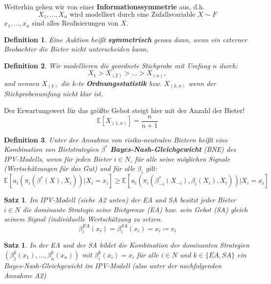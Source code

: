 \documentclass[12pt]{extreport} %
\theoremstyle{named}
\theoremstyle{itshape}
\newtheorem{satz}[unnamedtheorem]{Satz}
\newtheorem*{definition}{Definition}
\theoremstyle{normal}
\begin{document}
	Weiterhin gehen wir von einer \textbf{Informationssymmetrie} aus, d.h.
	$$ X_{1}, \dotsc, X_{n} \text{ wird modelliert durch eine Zufallsvariable } X \sim F $$
	$x_{1}, \dotsc, x_{n}$ sind alles Realisierungen von $X$.

 
\begin{definition}
	Eine Auktion heißt \textbf{symmetrisch} genau dann, wenn ein externer Beobachter die Bieter nicht unterscheiden kann.
\end{definition}

\begin{definition}
	Wir modellieren die geordnete Stichprobe mit Umfang $n$ durch:
		$$ X_{{1}} > X_{(2)} > \dotsc > X_{(n)}, $$
		und nennen $X_{(k)}$ die $k$-te \textbf{Ordnungsstatistik} bzw. $X_{(k, n)}$ wenn der Stichprobenumfang nicht klar ist.
\end{definition}

Der Erwartungswert für das größte Gebot steigt hier mit der Anzahl der Bieter!
	$$ \mathbb{E}[X_{(1,n)}] = \frac{n}{n+1} $$

\begin{definition}
	Unter der Annahme von risiko-neutralen Bietern heißt eine Kombination von Bietstrategien $\beta^{*}$ \textbf{Bayes-Nash-Gleichgewicht} (BNE) des IPV-Modells, wenn für jeden Bieter $i \in N$, für alle seine möglichen Signale (Wertschätzungen für das Gut) und für alle $\beta_{i}$ gilt:
	$$ \mathbb{E}\left[u_{i}\left(\pi_{i}\left(\beta^{*}(X), X_{i}\right) \right) \big| X_{i} = x_{i}\right] \geq \mathbb{E}\left[u_{i}\left(\pi_{i}\left(\beta_{-i}^{*}(X_{-i}), \beta_{i}(X_{i}), X_{i}\right) \right) \big| X_{i} = x_{i}\right] $$
\end{definition}


\begin{satz}
	Im IPV-Modell (siehe A2 unten) der EA und SA besitzt jeder Bieter $i \in N$ die dominante Strategie seine Bietgrenze (EA) bzw. sein Gebot (SA) gleich seinem Signal (individuelle Wertschätzung zu setzen.
	$$ \beta_{i}^{EA}(x_{i}) = \beta_{i}^{SA}(x_{i}) = x_{i} \coloneqq v_{i} $$
\end{satz}

\begin{satz}
	In der EA und der SA bildet die Kombination der dominanten Strategien $\left(\beta_{1}^{k}(x_{1}), \dotsc, \beta_{n}^{k}(x_{n}) \right)$ mit $\beta_{i}^{k}(x_{i}) = x_{i}$ für alle $i \in N$ und $k \in \{ EA, SA \}$ ein Bayes-Nash-Gleichgewicht im IPV-Modell (also unter der nachfolgenden Annahme A2)
\end{satz}
\end{document}
